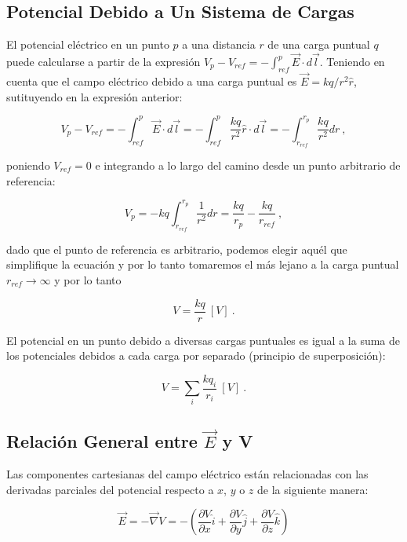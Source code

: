 \documentclass{tufte-handout}
\begin{document}
\subsection{Potencial Debido a Un Sistema de Cargas}

El potencial eléctrico en un punto $p$ a una distancia $r$ de una carga puntual $q$ puede calcularse a partir de la expresión $V_p - V_{ref} = -\int_{ref}^p \vec{E}\cdot d\vec{l}$. Teniendo en cuenta que el campo eléctrico debido a una carga puntual es $\vec{E} = kq/r^2 \hat{r}$, sutituyendo en la expresión anterior:

\begin{equation}
V_p - V_{ref} = -\int_{ref}^p \vec{E}\cdot d\vec{l} = -\int_{ref}^p \frac{kq}{r^2}\hat{r}\cdot d\vec{l} = -\int_{r_{ref}}^{r_p}\frac{kq}{r^2}dr~,
\end{equation}

poniendo $V_{ref} = 0$ e integrando a lo largo del camino desde un punto arbitrario de referencia:

\begin{equation}
V_p = -kq\int_{r_{ref}}^{r_p}\frac{1}{r^2}dr = \frac{kq}{r_p} - \frac{kq}{r_{ref}}~,
\end{equation}

dado que el punto de referencia es arbitrario, podemos elegir aquél que simplifique la ecuación y por lo tanto tomaremos el más lejano a la carga puntual $r_{ref} \rightarrow \infty$ y por lo tanto

\begin{equation}
V = \frac{kq}{r}~[V]~.
\end{equation}

El potencial en un punto debido a diversas cargas puntuales es igual a la suma de los potenciales debidos a cada carga por separado (principio de superposición):

\begin{equation}
V = \sum_i \frac{kq_i}{r_i}~[V]~.
\end{equation}

\subsection{Relación General entre $\vec{E}$ y V}

Las componentes cartesianas del campo eléctrico están relacionadas con las derivadas parciales del potencial respecto a $x$, $y$ o $z$ de la siguiente manera:

\begin{equation}
\vec{E} = -\vec{\nabla}V = -(\frac{\partial V}{\partial x}\hat{i} + \frac{\partial V}{\partial y}\hat{j} + \frac{\partial V}{\partial z}\hat{k})
\end{equation}
\end{document}
